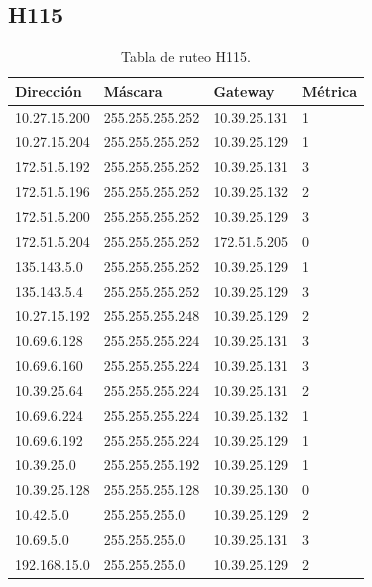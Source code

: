 \documentclass[12pt,titlepage]{article}
\begin{document}
\subsection{H115}
\begin{table}
  \begin{center}
    \begin{tabular}{|l|l|l|l|}
      \hline
        \bf{Direcci\'on} & \bf{M\'ascara} & \bf{Gateway} & \bf{M\'etrica} \\
      \hline 
	10.27.15.200  & 255.255.255.252 & 10.39.25.131 & 1 \\
        10.27.15.204  & 255.255.255.252 & 10.39.25.129 & 1 \\
        172.51.5.192  & 255.255.255.252 & 10.39.25.131 & 3 \\
        172.51.5.196  & 255.255.255.252 & 10.39.25.132 & 2 \\
        172.51.5.200  & 255.255.255.252 & 10.39.25.129 & 3 \\
        172.51.5.204  & 255.255.255.252 & 172.51.5.205 & 0 \\
        135.143.5.0   & 255.255.255.252 & 10.39.25.129 & 1 \\
        135.143.5.4   & 255.255.255.252 & 10.39.25.129 & 3 \\ 	
	10.27.15.192  & 255.255.255.248 & 10.39.25.129 & 2 \\
	10.69.6.128   & 255.255.255.224 & 10.39.25.131 & 3 \\
        10.69.6.160   & 255.255.255.224 & 10.39.25.131 & 3 \\
	10.39.25.64   & 255.255.255.224 & 10.39.25.131 & 2 \\       
	10.69.6.224   & 255.255.255.224 & 10.39.25.132 & 1 \\
	10.69.6.192   & 255.255.255.224 & 10.39.25.129 & 1 \\	
	10.39.25.0    & 255.255.255.192 & 10.39.25.129 & 1 \\
	10.39.25.128  & 255.255.255.128 & 10.39.25.130 & 0 \\
	10.42.5.0     & 255.255.255.0 & 10.39.25.129 & 2 \\
        10.69.5.0     & 255.255.255.0 & 10.39.25.131 & 3 \\
        192.168.15.0  & 255.255.255.0 & 10.39.25.129 & 2 \\  
    \hline
    \end{tabular} \\
  \end{center}
  \caption{Tabla de ruteo H115.}
\end{table}
\FloatBarrier
\end{document}
